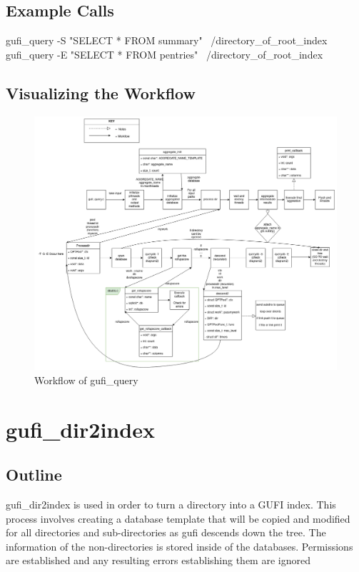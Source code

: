 \documentclass{article}
\begin{document}
\subsection{Example Calls}

gufi\_query -S "SELECT * FROM summary" ~/directory\_of\_root\_index
\\
gufi\_query -E "SELECT * FROM pentries" ~/directory\_of\_root\_index
\clearpage

\subsection{Visualizing the Workflow}


\begin{figure} [h]
\centering
\includegraphics[width=1.0\textwidth]{gufi_query.png}
\caption{\label{fig:gufi_query}Workflow of gufi\_query}
\end{figure}



\section{gufi\_dir2index}

\subsection{Outline}
gufi\_dir2index is used in order to turn a directory into a GUFI index. This process involves creating a database template that will be copied and modified for all directories and sub-directories as gufi descends down the tree. The information of the non-directories is stored inside of the databases. Permissions are established and any resulting errors establishing them are ignored
\end{document}
